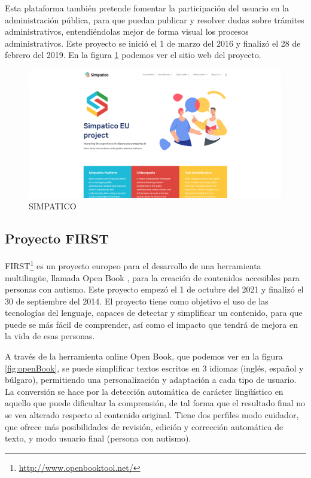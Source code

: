 Esta plataforma también pretende fomentar la participación del usuario en la administración pública, para que puedan publicar y resolver dudas sobre trámites administrativos, entendiéndolas mejor de forma visual los procesos administrativos. Este proyecto se inició el 1 de marzo del 2016 y finalizó el 28 de febrero del 2019. En la figura \ref{fig:simpatico} podemos ver el sitio web del proyecto.


\begin{figure}[h]
	\centering
	\includegraphics[width=1.0\textwidth]{Imagenes/ProyectosMateriales/simpatico}
	\caption{SIMPATICO}
	\label{fig:simpatico}
\end{figure} 




\subsection{Proyecto FIRST }

FIRST\footnote{\href{http://www.openbooktool.net/}{http://www.openbooktool.net/}} es un proyecto europeo para el desarrollo de una herramienta multilingüe, llamada Open Book \citep{openBook}, para la creación de contenidos accesibles para personas con autismo. Este proyecto empezó el 1 de octubre del 2021 y finalizó el 30 de septiembre del 2014.
El proyecto tiene como objetivo el uso de las tecnologías del lenguaje, capaces de detectar y simplificar un contenido, para que puede se más fácil de comprender, así como el impacto que tendrá de mejora en la vida de esas personas. 

A través de la herramienta online Open Book, que podemos ver en la figura \ref{fig:openBook}, se puede simplificar textos escritos en 3 idiomas (inglés, español y búlgaro), permitiendo una personalización y adaptación a cada tipo de usuario. La conversión se hace por la detección automática de carácter lingüístico en aquello que puede dificultar la comprensión, de tal forma que el resultado final no se vea alterado respecto al contenido original. Tiene dos perfiles modo cuidador, que ofrece más posibilidades de revisión, edición y corrección automática de texto, y modo usuario final (persona con autismo). 


